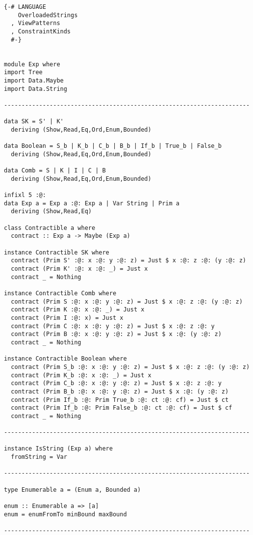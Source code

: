 \documentclass{article}
\begin{document}
\begin{lstlisting}
{-# LANGUAGE
    OverloadedStrings
  , ViewPatterns
  , ConstraintKinds
  #-}


module Exp where
import Tree
import Data.Maybe
import Data.String

----------------------------------------------------------------------

data SK = S' | K'
  deriving (Show,Read,Eq,Ord,Enum,Bounded)

data Boolean = S_b | K_b | C_b | B_b | If_b | True_b | False_b
  deriving (Show,Read,Eq,Ord,Enum,Bounded)

data Comb = S | K | I | C | B
  deriving (Show,Read,Eq,Ord,Enum,Bounded)

infixl 5 :@:
data Exp a = Exp a :@: Exp a | Var String | Prim a
  deriving (Show,Read,Eq)

class Contractible a where
  contract :: Exp a -> Maybe (Exp a)

instance Contractible SK where
  contract (Prim S' :@: x :@: y :@: z) = Just $ x :@: z :@: (y :@: z)
  contract (Prim K' :@: x :@: _) = Just x
  contract _ = Nothing

instance Contractible Comb where
  contract (Prim S :@: x :@: y :@: z) = Just $ x :@: z :@: (y :@: z)
  contract (Prim K :@: x :@: _) = Just x
  contract (Prim I :@: x) = Just x
  contract (Prim C :@: x :@: y :@: z) = Just $ x :@: z :@: y
  contract (Prim B :@: x :@: y :@: z) = Just $ x :@: (y :@: z)
  contract _ = Nothing

instance Contractible Boolean where
  contract (Prim S_b :@: x :@: y :@: z) = Just $ x :@: z :@: (y :@: z)
  contract (Prim K_b :@: x :@: _) = Just x
  contract (Prim C_b :@: x :@: y :@: z) = Just $ x :@: z :@: y
  contract (Prim B_b :@: x :@: y :@: z) = Just $ x :@: (y :@: z)
  contract (Prim If_b :@: Prim True_b :@: ct :@: cf) = Just $ ct
  contract (Prim If_b :@: Prim False_b :@: ct :@: cf) = Just $ cf
  contract _ = Nothing

----------------------------------------------------------------------

instance IsString (Exp a) where
  fromString = Var

----------------------------------------------------------------------

type Enumerable a = (Enum a, Bounded a)

enum :: Enumerable a => [a]
enum = enumFromTo minBound maxBound

----------------------------------------------------------------------


\end{lstlisting}
\end{document}
